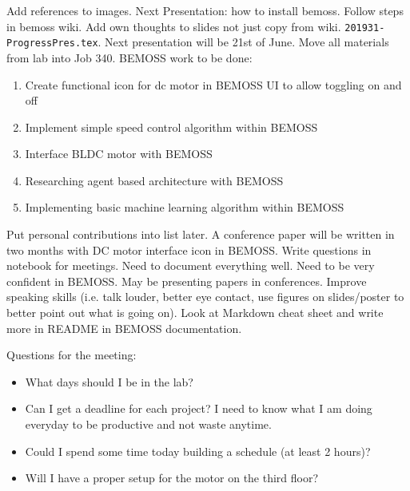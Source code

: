 \documentclass[fontsize=11pt, %
                             paper=letter, %
                             twoside, %
                             captions=tableheading,
                             index=totoc,
                             hyperref]{labbook}
\begin{document}
\begin{addmargin}[0cm]{0cm}
Add references to images. Next Presentation: how to install bemoss. Follow steps in bemoss wiki. Add own thoughts to slides not just copy from wiki. \texttt{201931-ProgressPres.tex}. Next presentation will be 21st of June. 
\bigbreak\noindent
Move all materials from lab into Job 340.
\bigbreak\noindent
BEMOSS work to be done: 
\begin{enumerate}
\item Create functional icon for dc motor in BEMOSS UI to allow toggling on and off
\item Implement simple speed control algorithm within BEMOSS
\item Interface BLDC motor with BEMOSS
\item Researching agent based architecture with BEMOSS
\item Implementing basic machine learning algorithm within BEMOSS
\end{enumerate}
Put personal contributions into list later. 
\bigbreak\noindent
A conference paper will be written in two months with DC motor interface icon in BEMOSS. 
\bigbreak\noindent
Write questions in notebook for meetings. Need to document everything well. 
\bigbreak\noindent
Need to be very confident in BEMOSS. May be presenting papers in conferences. 
\bigbreak\noindent
Improve speaking skills (i.e. talk louder, better eye contact, use figures on slides/poster to better point out what is going on). 
\bigbreak\noindent
Look at Markdown cheat sheet and write more in README in BEMOSS documentation.

Questions for the meeting:
\begin{itemize}
\item What days should I be in the lab?
\item Can I get a deadline for each project? I need to know what I am doing everyday to be productive and not waste anytime.
\item Could I spend some time today building a schedule (at least 2 hours)?
\item Will I have a proper setup for the motor on the third floor?
\end{itemize}


\end{addmargin}
\end{document}

